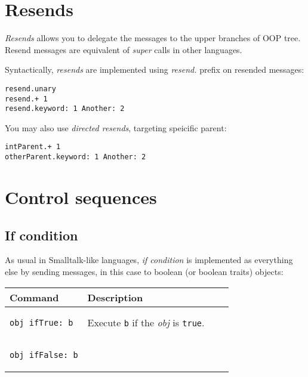 \documentclass[10pt]{article}
\begin{document}
\begin{multicols*}{3}
\section{Resends}
\textit{Resends} allows you to delegate the messages to the upper branches of OOP tree. Resend messages are equivalent of \textit{super} calls in other languages.

Syntactically, \textit{resends} are implemented using \textit{resend.} prefix on resended messages:

\begin{lstlisting}
resend.unary
resend.+ 1
resend.keyword: 1 Another: 2
\end{lstlisting}

You may also use \textit{directed resends}, targeting speicific parent:

\begin{lstlisting}
intParent.+ 1
otherParent.keyword: 1 Another: 2
\end{lstlisting}

\section{Control sequences}
\subsection{If condition}

As usual in Smalltalk-like languages, \textit{if condition} is implemented as everything else by sending messages, in this case to boolean (or boolean traits) objects:

\vspace*{0.2cm}

\begin{tabular}{ p{70pt} p{140pt} l l }
Command & Description \\ \hline

\begin{lstlisting}
obj ifTrue: b
\end{lstlisting}
&\vspace*{0.25cm}

Execute \texttt{b} if the \textit{obj} is \texttt{true}.

\\\hline %

\begin{lstlisting}
obj ifFalse: b
\end{lstlisting}
&\vspace*{0.25cm}


\end{tabular}
\end{multicols*}
\end{document}
